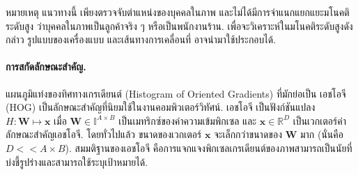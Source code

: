 หมายเหตุ
แนวทางนี้ เพียงตรวจจับตำแหน่งของบุคคลในภาพ และไม่ได้มีการจำแนกแยกแยะมโนคติระดับสูง 
ว่าบุคคลในภาพเป็นลูกค้าจริง ๆ หรือเป็นพนักงานร้าน.
เพื่อจะวิเคราะห์ในมโนคติระดับสูงดังกล่าว
รูปแบบของเครื่องแบบ และเส้นทางการเคลื่อนที่ อาจนำมาใช้ประกอบได้.

\paragraph{การสกัดลักษณะสำคัญ.}

แผนภูมิแท่งของทิศทางเกรเดียนต์ (Histogram of Oriented Gradients\cite{DalalTriggs2005a}) 
ที่มักย่อเป็น เอชโอจี (HOG) เป็นลักษณะสำคัญที่นิยมใช้ในงานคอมพิวเตอร์วิทัศน์.
เอชโอจี เป็นฟังก์ชันแปลง $H: \bm{W} \mapsto \bm{x}$ เมื่อ $\bm{W} \in \mathbb{I}^{A \times B}$
เป็นเมทริกซ์ของค่าความเข้มพิกเซล และ $\bm{x} \in \mathbb{R}^D$ เป็นเวกเตอร์ค่าลักษณะสำคัญเอชโอจี. %
โดยทั่วไปแล้ว ขนาดของเวกเตอร์ $\bm{x}$ จะเล็กกว่าขนาดของ $\bm{W}$ มาก (นั่นคือ $D << A \times B$). 
สมมติฐานของเอชโอจี
คือการแจกแจงพิกเซลเกรเดียนต์ของภาพสามารถเป็นนัยที่บ่งชี้รูปร่างและสามารถใช้ระบุเป้าหมายได้.

